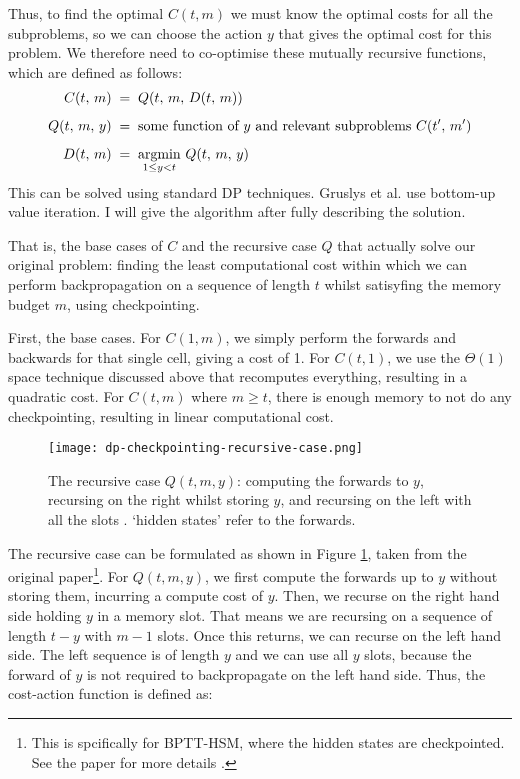 Thus, to find the optimal \(C(t, m)\) we must know the optimal costs for all the subproblems, so we can choose the action \(y\) that gives the optimal cost for this problem.
We therefore need to co-optimise these mutually recursive functions, which are defined as follows:
\begin{align*}
    C(t,\, m)      \;&=\; Q(t,\, m,\, D(t,\, m))\\[0.5em]
    Q(t,\, m,\, y) \;&=\; \text{some function of } y \text{ and relevant subproblems } C(t^\prime,\, m^\prime)\\[0.5em]
    D(t,\, m)      \;&=\; \mathop{\mathrm{argmin}}_{1\leq y < t}\, Q(t,\, m,\, y)
\end{align*}
This can be solved using standard DP techniques. Gruslys et al. use bottom-up value iteration.
I will give the algorithm after fully describing the solution.

That is, the base cases of \(C\) and the recursive case \(Q\) that actually solve our original problem: finding the least computational cost within which we can perform backpropagation on a sequence of length \(t\) whilst satisyfing the memory budget \(m\), using checkpointing.

First, the base cases. 
For \(C(1, m)\), we simply perform the forwards and backwards for that single cell, giving a cost of 1.
For \(C(t, 1)\), we use the \(\Theta(1)\) space technique discussed above that recomputes everything, resulting in a quadratic cost.
For \(C(t, m)\) where \(m \geq t\), there is enough memory to not do any checkpointing, resulting in linear computational cost.

\begin{figure}[t]
    \centering
    \texttt{[image: dp-checkpointing-recursive-case.png]}
    \caption{The recursive case \(Q(t, m, y)\): computing the forwards to \(y\), recursing on the right whilst storing \(y\), and recursing on the left with all the slots \cite[Figure~1]{Gruslys2016}. `hidden states' refer to the forwards.}
    \label{fig:2-dp-checkpointing-rec}
\end{figure}

The recursive case can be formulated as shown in Figure \ref{fig:2-dp-checkpointing-rec}, taken from the original paper\footnote{This is spcifically for BPTT-HSM, where the hidden states are checkpointed. See the paper for more details \cite{Gruslys2016}.}.
For \(Q(t, m, y)\), we first compute the forwards up to \(y\) without storing them, incurring a compute cost of \(y\).
Then, we recurse on the right hand side holding \(y\) in a memory slot.
That means we are recursing on a sequence of length \(t-y\) with \(m-1\) slots.
Once this returns, we can recurse on the left hand side.
The left sequence is of length \(y\) and we can use all \(y\) slots, because the forward of \(y\) is not required to backpropagate on the left hand side.
Thus, the cost-action function is defined as:

